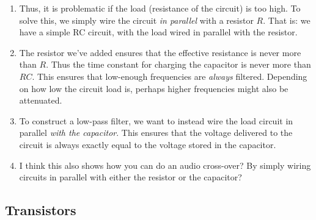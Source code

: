 \documentclass[11pt, oneside]{amsart}
\begin{document}
\begin{enumerate}
  \item Thus, it is problematic if the load (resistance of the circuit)
  is too high. To solve this, we simply wire the circuit \emph{in
  parallel} with a resistor $R$. That is: we have a simple RC circuit,
  with the load wired in parallel with the resistor.

  \item The resistor we've added ensures that the effective resistance
  is never more than $R$. Thus the time constant for charging the
  capacitor is never more than $RC$. This ensures that low-enough
  frequencies are \emph{always} filtered. Depending on how low the
  circuit load is, perhaps higher frequencies might also be attenuated.

  \item To construct a low-pass filter, we want to instead wire the load
  circuit in parallel \emph{with the capacitor}. This ensures that the
  voltage delivered to the circuit is always exactly equal to the
  voltage stored in the capacitor.

  \item I think this also shows how you can do an audio cross-over? By
  simply wiring circuits in parallel with either the resistor or the
  capacitor?

\end{enumerate}

\subsection{Transistors}
\end{document}
